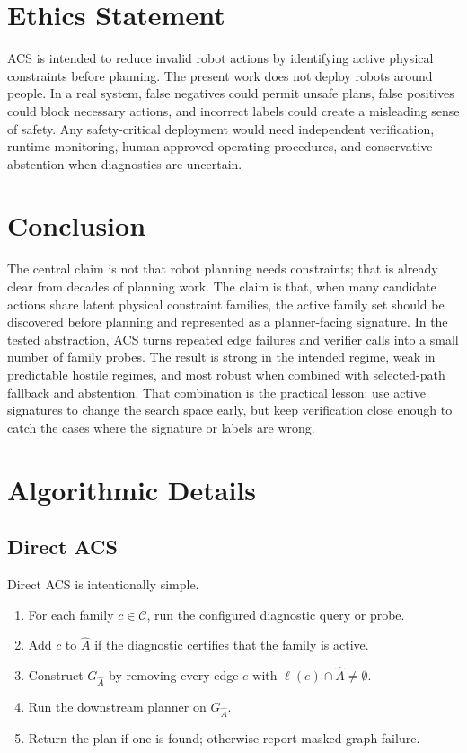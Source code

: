 \documentclass{article}
\newcommand{\ACS}{\textsc{ACS}}
\newcommand{\Cset}{\mathcal{C}}
\newcommand{\Ahat}{\hat{A}}
\newcommand{\Gmask}{G_{\Ahat}}
\begin{document}
\section{Ethics Statement}

\ACS{} is intended to reduce invalid robot actions by identifying active physical constraints before planning. The present work does not deploy robots around people. In a real system, false negatives could permit unsafe plans, false positives could block necessary actions, and incorrect labels could create a misleading sense of safety. Any safety-critical deployment would need independent verification, runtime monitoring, human-approved operating procedures, and conservative abstention when diagnostics are uncertain.

\section{Conclusion}

The central claim is not that robot planning needs constraints; that is already clear from decades of planning work. The claim is that, when many candidate actions share latent physical constraint families, the active family set should be discovered before planning and represented as a planner-facing signature. In the tested abstraction, \ACS{} turns repeated edge failures and verifier calls into a small number of family probes. The result is strong in the intended regime, weak in predictable hostile regimes, and most robust when combined with selected-path fallback and abstention. That combination is the practical lesson: use active signatures to change the search space early, but keep verification close enough to catch the cases where the signature or labels are wrong.




\appendix

\section{Algorithmic Details}

\subsection{Direct \ACS{}}

Direct \ACS{} is intentionally simple.
\begin{enumerate}
    \item For each family $c\in\Cset$, run the configured diagnostic query or probe.
    \item Add $c$ to $\Ahat$ if the diagnostic certifies that the family is active.
    \item Construct $\Gmask$ by removing every edge $e$ with $\ell(e)\cap\Ahat\neq\emptyset$.
    \item Run the downstream planner on $\Gmask$.
    \item Return the plan if one is found; otherwise report masked-graph failure.
\end{enumerate}
\end{document}
